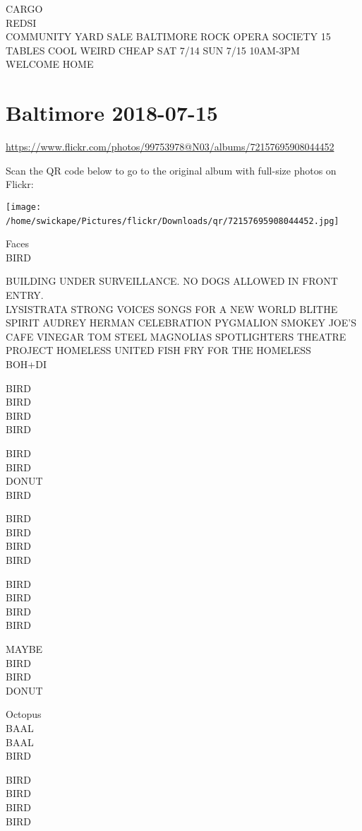 \documentclass[10pt,letterpaper]{article}
\begin{document}
CARGO\\
REDSI\\
COMMUNITY YARD SALE BALTIMORE ROCK OPERA SOCIETY 15 TABLES COOL WEIRD CHEAP SAT 7/14 SUN 7/15 10AM{-}3PM\\
WELCOME HOME
\

\section*{Baltimore 2018-07-15}

\url{https://www.flickr.com/photos/99753978@N03/albums/72157695908044452}

Scan the QR code below to go to the original album with full-size photos on Flickr:

\texttt{[image: /home/swickape/Pictures/flickr/Downloads/qr/72157695908044452.jpg]}
\

Faces\\
BIRD

BUILDING UNDER SURVEILLANCE.  NO DOGS ALLOWED IN FRONT ENTRY.\\
LYSISTRATA STRONG VOICES SONGS FOR A NEW WORLD BLITHE SPIRIT AUDREY HERMAN CELEBRATION PYGMALION SMOKEY JOE'S CAFE VINEGAR TOM STEEL MAGNOLIAS SPOTLIGHTERS THEATRE\\
PROJECT HOMELESS UNITED FISH FRY FOR THE HOMELESS\\
BOH+DI

BIRD\\
BIRD\\
BIRD\\
BIRD

BIRD\\
BIRD\\
DONUT\\
BIRD

BIRD\\
BIRD\\
BIRD\\
BIRD

BIRD\\
BIRD\\
BIRD\\
BIRD

MAYBE\\
BIRD\\
BIRD\\
DONUT

Octopus\\
BAAL\\
BAAL\\
BIRD

BIRD\\
BIRD\\
BIRD\\
BIRD
\end{document}
